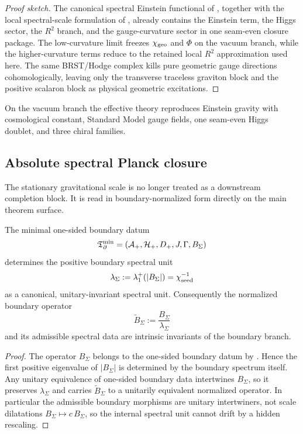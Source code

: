 \begin{proof}[Proof sketch]
The canonical spectral Einstein functional of
, together with the local
spectral-scale formulation of , already contains the Einstein
term, the Higgs sector, the $R^2$ branch, and the gauge-curvature sector in one seam-even closure
package. The low-curvature limit freezes $\chi_{\mathrm{geo}}$ and $\Phi$ on the vacuum branch, while the
higher-curvature terms reduce to the retained local $R^2$ approximation used here. The same
BRST/Hodge complex kills pure geometric gauge directions cohomologically, leaving only the
transverse traceless graviton block and the positive scalaron block as physical geometric
excitations.
\end{proof}

\begin{corollary}
On the vacuum branch the effective theory reproduces Einstein gravity with cosmological constant, Standard Model gauge fields, one seam-even Higgs doublet, and three chiral families.
\end{corollary}

\subsection{Absolute spectral Planck closure}

The stationary gravitational scale is no longer treated as a downstream completion block. It is read
in boundary-normalized form directly on the main theorem surface.

\begin{theorem}
\label{thm:boundary-spectral-unit-rigidity}
The minimal one-sided boundary datum
\[
\mathfrak T_{\partial}^{\min}=(\mathcal A_+,\mathcal H_+,D_+,J,\Gamma,B_\Sigma)
\]
determines the positive boundary spectral unit
\[
\lambda_\Sigma:=\lambda_1^+(|B_\Sigma|)=\chi_{\mathrm{seed}}^{-1}
\]
as a canonical, unitary-invariant spectral unit. Consequently the normalized boundary operator
\[
\widetilde B_\Sigma:=\frac{B_\Sigma}{\lambda_\Sigma}
\]
and its admissible spectral data are intrinsic invariants of the boundary branch.
\end{theorem}

\begin{proof}
The operator $B_\Sigma$ belongs to the one-sided boundary datum by
. Hence the first positive eigenvalue of $|B_\Sigma|$ is determined
by the boundary spectrum itself. Any unitary equivalence of one-sided boundary data intertwines
$B_\Sigma$, so it preserves $\lambda_\Sigma$ and carries $\widetilde B_\Sigma$ to a unitarily
equivalent normalized operator. In particular the admissible boundary morphisms are unitary
intertwiners, not scale dilatations $B_\Sigma\mapsto c\,B_\Sigma$, so the internal spectral unit
cannot drift by a hidden rescaling.
\end{proof}

